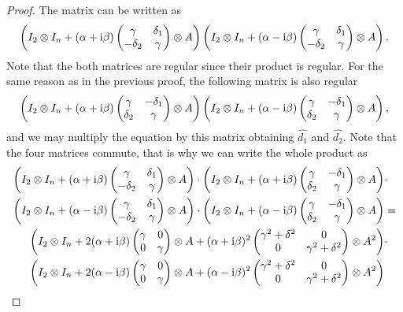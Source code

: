 \documentclass[11pt,a4paper]{article}
\begin{document}
\begin{proof}
The matrix can be written as
$$\left(I_2\otimes I_n+(\alpha+\mathrm i\beta)
\begin{pmatrix}\gamma&\delta_1\cr-\delta_2&\gamma\end{pmatrix}\otimes A\right)
\left(I_2\otimes I_n +(\alpha-\mathrm i\beta)
\begin{pmatrix}\gamma&\delta_1\cr-\delta_2&\gamma\end{pmatrix}\otimes A\right).
$$
Note that the both matrices are regular since their product is
regular. For the same reason as in the previous proof, the following
matrix is also regular
$$\left(I_2\otimes I_n+(\alpha+\mathrm i\beta)
\begin{pmatrix}\gamma&-\delta_1\cr\delta_2&\gamma\end{pmatrix}\otimes A\right)
\left(I_2\otimes I_n +(\alpha-\mathrm i\beta)
\begin{pmatrix}\gamma&-\delta_1\cr\delta_2&\gamma\end{pmatrix}\otimes A\right),
$$
and we may multiply the equation by this matrix obtaining
$\widehat{d_1}$ and $\widehat{d_2}$. Note that the four matrices
commute, that is why we can write the whole product as
\begin{align*}
\left(I_2\otimes I_n + (\alpha+\mathrm i\beta)
\begin{pmatrix}\gamma&\delta_1\cr-\delta_2&\gamma\end{pmatrix}\otimes A\right)\cdot
\left(I_2\otimes I_n + (\alpha+\mathrm i\beta)
\begin{pmatrix}\gamma&-\delta_1\cr\delta_2&\gamma\end{pmatrix}\otimes A\right)&\cdot\\
\left(I_2\otimes I_n + (\alpha-\mathrm i\beta)
\begin{pmatrix}\gamma&\delta_1\cr-\delta_2&\gamma\end{pmatrix}\otimes A\right)\cdot
\left(I_2\otimes I_n + (\alpha-\mathrm i\beta)
\begin{pmatrix}\gamma&-\delta_1\cr\delta_2&\gamma\end{pmatrix}\otimes A\right)&=\\
\left(I_2\otimes I_n + 2(\alpha + \mathrm i\beta)
\begin{pmatrix}\gamma&0\cr 0&\gamma\end{pmatrix}\otimes A +
(\alpha + \mathrm i\beta)^2
\begin{pmatrix}\gamma^2+\delta^2&0\cr 0&\gamma^2+\delta^2\end{pmatrix}\otimes A^2
\right)&\cdot\\
\left(I_2\otimes I_n + 2(\alpha - \mathrm i\beta)
\begin{pmatrix}\gamma&0\cr 0&\gamma\end{pmatrix}\otimes A +
(\alpha - \mathrm i\beta)^2
\begin{pmatrix}\gamma^2+\delta^2&0\cr 0&\gamma^2+\delta^2\end{pmatrix}\otimes A^2
\right)&
\end{align*}


\end{proof}
\end{document}
